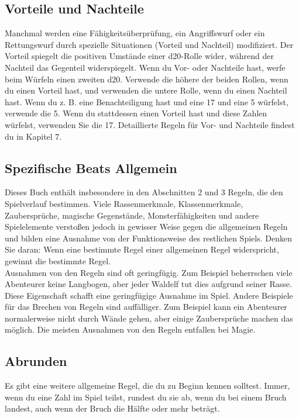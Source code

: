 \subsection{Vorteile und Nachteile}

Manchmal werden eine Fähigkeitsüberprüfung, ein Angriffswurf oder ein Rettungswurf durch spezielle Situationen (Vorteil und Nachteil) modifiziert. Der Vorteil spiegelt die positiven Umstände einer d20-Rolle wider, während der Nachteil das Gegenteil widerspiegelt. Wenn du Vor- oder Nachteile hast, werfe beim Würfeln einen zweiten d20. Verwende die höhere der beiden Rollen, wenn du einen Vorteil hast, und verwenden die untere Rolle, wenn du einen Nachteil hast. Wenn du z. B. eine Benachteiligung hast und eine 17 und eine 5 würfelst, verwende die 5. Wenn du stattdessen einen Vorteil hast und diese Zahlen würfelst, verwenden Sie die 17. Detaillierte Regeln für Vor- und Nachteile findest du in Kapitel 7.

\subsection{Spezifische Beats Allgemein}
Dieses Buch enthält insbesondere in den Abschnitten 2 und 3 Regeln, die den Spielverlauf bestimmen. Viele Rassenmerkmale, Klassenmerkmale, Zaubersprüche, magische Gegenstände, Monsterfähigkeiten und andere Spielelemente verstoßen jedoch in gewisser Weise gegen die allgemeinen Regeln und bilden eine Ausnahme von der Funktionsweise des restlichen Spiels. Denken Sie daran: Wenn eine bestimmte Regel einer allgemeinen Regel widerspricht, gewinnt die bestimmte Regel. \\
Ausnahmen von den Regeln sind oft geringfügig. Zum Beispiel beherrschen viele Abenteurer keine Langbogen, aber jeder Waldelf tut dies aufgrund seiner Rasse. Diese Eigenschaft schafft eine geringfügige Ausnahme im Spiel. Andere Beispiele für das Brechen von Regeln sind auffälliger. Zum Beispiel kann ein Abenteurer normalerweise nicht durch Wände gehen, aber einige Zaubersprüche machen das möglich. Die meisten Ausnahmen von den Regeln entfallen bei Magie.
\subsection{Abrunden}
Es gibt eine weitere allgemeine Regel, die du zu Beginn kennen solltest. Immer, wenn du eine Zahl im Spiel teilst, rundest du sie ab, wenn du bei einem Bruch landest, auch wenn der Bruch die Hälfte oder mehr beträgt.

